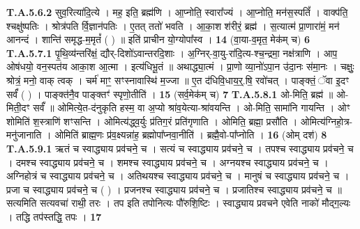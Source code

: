 \documentclass[17pt]{extarticle}
\begin{document}
                                                                  \textbf{ T.A.5.6.2} \newline
                  सुव॒रित्या॑दि॒त्ये । मह॒ इति॒ ब्रह्म॑णि । आ॒प्नोति॒ स्वारा᳚ज्यं । आ॒प्नोति॒ मन॑स॒स्पतिं᳚ । वाक्प॑ति॒ श्चक्षु॑ष्पतिः । श्रोत्र॑पति र्वि॒ज्ञान॑पतिः ।  ए॒तत् ततो॑ भवति । आ॒का॒श श॑रीरं॒ ब्रह्म॑ ।  स॒त्यात्म॑ प्रा॒णारा॑मं॒ मन॑ आनन्दं । शान्ति॑ समृद्ध-म॒मृतं᳚ ( ) ॥  इति॑ प्राचीन यो॒ग्योपा᳚स्व । \textbf{ 14} \newline
                  \newline
                                                        (वा॒या-व॒मृत॒ मेक॑म् च) \textbf{6} \newline \newline
                                \textbf{ T.A.5.7.1} \newline
                  पृ॒थि॒व्य॑न्तरि॑क्षं॒ द्यौर्-दिशो॑ऽवान्तरदि॒शाः । अ॒ग्निर्-वा॒यु-रा॑दि॒त्य-श्च॒न्द्रमा॒ नक्ष॑त्राणि ।  आप॒ ओष॑धयो॒ वन॒स्पत॑य आका॒श आ॒त्मा । इत्य॑धिभू॒तं ॥ अथाद्ध्या॒त्मं । प्रा॒णो व्या॒नो॑ऽपा॒न उ॑दा॒नः स॑मा॒नः । चक्षुः॒ श्रोत्रं॒ मनो॒ वाक् त्वक् ।  चर्म॑ माꣳ॒॒ सꣳस्नावास्थि॑ म॒ज्जा ॥  ए॒त द॑धिवि॒धाय॒र्॒.षि॒ रवो॑चत् ।  पाङ्क्तं॒ ॅवा इ॒दꣳ सर्वं᳚ ( ) ।  पाङ्क्त॑नै॒व पाङ्क्तꣳ॑ स्पृणो॒तीति॑ । \textbf{ 15} \newline
                  \newline
                                                        (सर्व॒मेक॑म् च) \textbf{7} \newline \newline
                                \textbf{ T.A.5.8.1} \newline
                  ओ-मिति॒ ब्रह्म॑ ॥ ओ-मिती॒दꣳ सर्वं᳚ ॥  ओमित्ये॒त-द॑नुकृति हस्म॒ वा अ॒प्यो श्रा॑व॒येत्या-श्रा॑वयन्ति । ओ-मिति॒ सामा॑नि गायन्ति । ओꣳ शोमिति॑ श॒स्त्राणि॑ शꣳसन्ति । ओमित्य॑द्ध्व॒र्युः प्र॑तिग॒रं प्रति॑गृणाति । ओमिति॒ ब्रह्मा॒ प्रसौ॑ति ।  ओमित्य॑ग्निहो॒त्र-मनु॑जानाति । ओमिति॑ ब्राह्म॒णः प्र॑व॒क्ष्यन्ना॑ह॒ ब्रह्मोपा᳚प्नवा॒नीति॑ ।  ब्रह्मै॒वो-पा᳚प्नोति । \textbf{ 16} \newline
                  \newline
                                                        (ओम् दश॑) \textbf{8} \newline \newline
                                \textbf{ T.A.5.9.1} \newline
                  ऋतं च स्वाद्ध्याय प्रव॑चने॒ च ।  सत्यं च स्वाद्ध्याय प्रव॑चने॒ च ।  तपश्च स्वाद्ध्याय प्रव॑चने॒ च ।  दमश्च स्वाद्ध्याय प्रव॑चने॒ च ।  शमश्च स्वाद्ध्याय प्रव॑चने॒ च ।  अग्नयश्च स्वाद्ध्याय प्रव॑चने॒ च ।  अग्निहोत्रं च स्वाद्ध्याय प्रव॑चने॒ च ।  अतिथयश्च स्वाद्ध्याय प्रव॑चने॒ च ।  मानुषं च स्वाद्ध्याय प्रव॑चने॒ च ।  प्रजा च स्वाद्ध्याय प्रव॑चने॒ च ( ) ।  प्रजनश्च स्वाद्ध्याय प्रव॑चने॒ च ।  प्रजातिश्च स्वाद्ध्याय प्रव॑चने॒ च ॥  सत्यमिति सत्यवचा॑ राथी॒ तरः ।  तप इति तपोनित्यः पौ॑रुशि॒ष्टिः ।  स्वाद्ध्याय प्रवचने एवेति नाको॑ मौद्ग॒ल्यः ।  तद्धि तप॑स्तद्धि॒ तपः । \textbf{ 17} \newline
\end{document}
